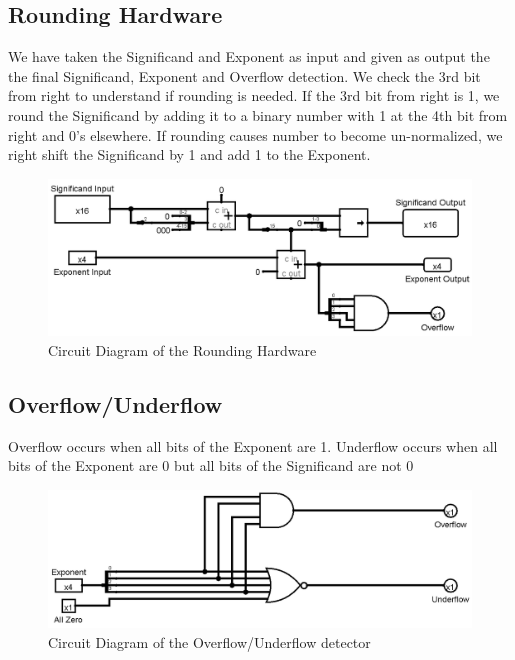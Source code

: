 \documentclass[12pt, a4paper]{article}
\begin{document}
	\subsection{Rounding Hardware}
	We have taken the Significand and Exponent as input and given as output the
	the final Significand, Exponent and Overflow detection. We check the 3rd
	bit from right to understand if rounding is needed.
	If the 3rd bit from right is 1, we round the Significand by adding it to a
	binary number with 1 at the 4th bit from right and 0's elsewhere.
	If rounding causes number to become un-normalized, we right shift the
	Significand by 1 and add 1 to the Exponent.
	\begin{figure}[h!]
		\centering
		\includegraphics[scale = 0.35]{round}
		\caption{Circuit Diagram of the Rounding Hardware}
		\label{fig10}
	\end{figure}
	\subsection{Overflow/Underflow}
	Overflow occurs when all bits of the Exponent are 1. Underflow occurs
	when all bits of the Exponent are 0 but all bits of the Significand are
	not 0
	\begin{figure}[h!]
		\centering
		\includegraphics[width = 0.9\linewidth]{over}
		\caption{Circuit Diagram of the Overflow/Underflow detector}
		\label{fig11}
	\end{figure}
\end{document}
